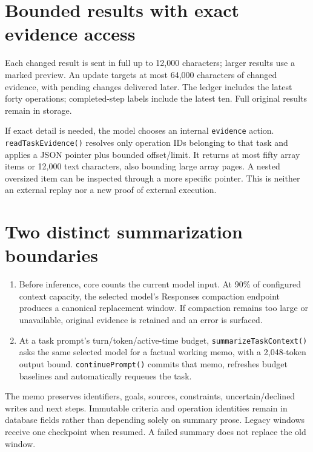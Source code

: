 \section*{Bounded results with exact evidence access}
Each changed result is sent in full up to 12,000 characters; larger results use a marked preview. An update targets at most 64,000 characters of changed evidence, with pending changes delivered later. The ledger includes the latest forty operations; completed-step labels include the latest ten. Full original results remain in storage.

If exact detail is needed, the model chooses an internal \texttt{evidence} action. \texttt{readTaskEvidence()} resolves only operation IDs belonging to that task and applies a JSON pointer plus bounded offset/limit. It returns at most fifty array items or 12,000 text characters, also bounding large array pages. A nested oversized item can be inspected through a more specific pointer. This is neither an external replay nor a new proof of external execution.
\section*{Two distinct summarization boundaries}
\begin{enumerate}
\item Before inference, core counts the current model input. At 90\% of configured context capacity, the selected model's Responses compaction endpoint produces a canonical replacement window. If compaction remains too large or unavailable, original evidence is retained and an error is surfaced.
\item At a task prompt's turn/token/active-time budget, \texttt{summarizeTaskContext()} asks the same selected model for a factual working memo, with a 2,048-token output bound. \texttt{continuePrompt()} commits that memo, refreshes budget baselines and automatically requeues the task.
\end{enumerate}
The memo preserves identifiers, goals, sources, constraints, uncertain/declined writes and next steps. Immutable criteria and operation identities remain in database fields rather than depending solely on summary prose. Legacy windows receive one checkpoint when resumed. A failed summary does not replace the old window.
